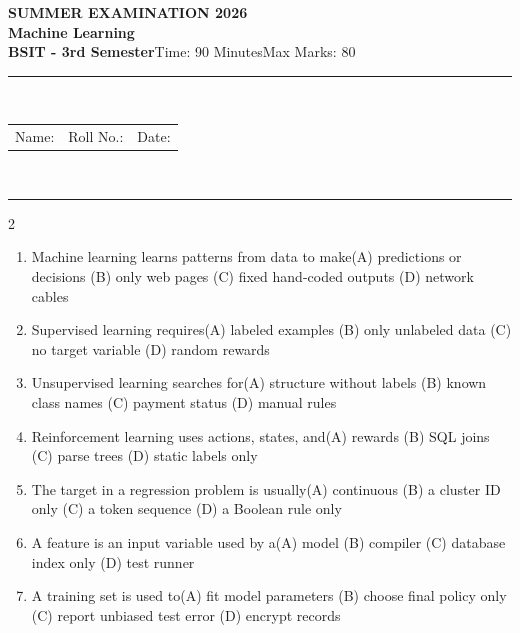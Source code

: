 \documentclass[a4paper]{article}
\makeatletter
\newcommand{\examheader}{%
\begin{center}\textbf{\large SUMMER EXAMINATION 2026}\\[-1pt]
\textbf{\normalsize Machine Learning}\\[-1pt]
\textbf{BSIT - 3rd Semester}\quad Time: 90 Minutes\quad Max Marks: 80\\[-1pt]
\textcolor{black!65}{\rule{\linewidth}{0.45pt}}\\[-2pt]
\begin{tabularx}{\linewidth}{@{}X X X@{}}Name: \hrulefill & Roll No.: \hrulefill & Date: \hrulefill\end{tabularx}\\[-1pt]
\textcolor{black!65}{\rule{\linewidth}{0.45pt}}\end{center}}
\makeatother
\begin{document}
\examheader
\raggedcolumns
\begin{multicols*}{2}
\fontsize{8.5}{10}\selectfont
\begin{enumerate}
\item Machine learning learns patterns from data to make\newline\hspace*{0.6em}(A) predictions or decisions \quad (B) only web pages \newline\hspace*{0.6em}(C) fixed hand-coded outputs \quad (D) network cables
\item Supervised learning requires\newline\hspace*{0.6em}(A) labeled examples \quad (B) only unlabeled data \newline\hspace*{0.6em}(C) no target variable \quad (D) random rewards
\item Unsupervised learning searches for\newline\hspace*{0.6em}(A) structure without labels \quad (B) known class names \newline\hspace*{0.6em}(C) payment status \quad (D) manual rules
\item Reinforcement learning uses actions, states, and\newline\hspace*{0.6em}(A) rewards \quad (B) SQL joins \newline\hspace*{0.6em}(C) parse trees \quad (D) static labels only
\item The target in a regression problem is usually\newline\hspace*{0.6em}(A) continuous \quad (B) a cluster ID only \newline\hspace*{0.6em}(C) a token sequence \quad (D) a Boolean rule only
\item A feature is an input variable used by a\newline\hspace*{0.6em}(A) model \quad (B) compiler \newline\hspace*{0.6em}(C) database index only \quad (D) test runner
\item A training set is used to\newline\hspace*{0.6em}(A) fit model parameters \quad (B) choose final policy only \newline\hspace*{0.6em}(C) report unbiased test error \quad (D) encrypt records

\end{enumerate}
\end{multicols*}
\end{document}
